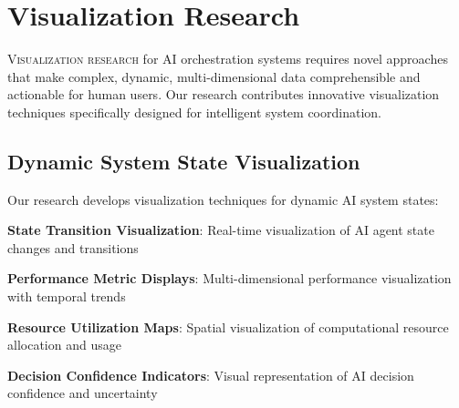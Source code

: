 
\section*{Visualization Research}

\lettrine{V}{isualization research} for AI orchestration systems requires novel approaches that make complex, dynamic, multi-dimensional data comprehensible and actionable for human users. Our research contributes innovative visualization techniques specifically designed for intelligent system coordination.

\subsection*{Dynamic System State Visualization}

Our research develops visualization techniques for dynamic AI system states:

\begin{compactlist}
    \item \textbf{State Transition Visualization}: Real-time visualization of AI agent state changes and transitions
    \item \textbf{Performance Metric Displays}: Multi-dimensional performance visualization with temporal trends
    \item \textbf{Resource Utilization Maps}: Spatial visualization of computational resource allocation and usage
    \item \textbf{Decision Confidence Indicators}: Visual representation of AI decision confidence and uncertainty
\end{compactlist}

